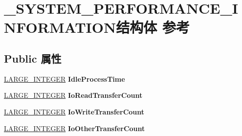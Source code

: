 \hypertarget{struct___s_y_s_t_e_m___p_e_r_f_o_r_m_a_n_c_e___i_n_f_o_r_m_a_t_i_o_n}{}\section{\+\_\+\+S\+Y\+S\+T\+E\+M\+\_\+\+P\+E\+R\+F\+O\+R\+M\+A\+N\+C\+E\+\_\+\+I\+N\+F\+O\+R\+M\+A\+T\+I\+O\+N结构体 参考}
\label{struct___s_y_s_t_e_m___p_e_r_f_o_r_m_a_n_c_e___i_n_f_o_r_m_a_t_i_o_n}
\subsection*{Public 属性}
\begin{DoxyCompactItemize}
\item 
\mbox{\label{struct___s_y_s_t_e_m___p_e_r_f_o_r_m_a_n_c_e___i_n_f_o_r_m_a_t_i_o_n_a7e06eb7b575a781a334819c48fd06e90}} 
\hyperlink{union___l_a_r_g_e___i_n_t_e_g_e_r}{L\+A\+R\+G\+E\+\_\+\+I\+N\+T\+E\+G\+ER} {\bfseries Idle\+Process\+Time}
\item 
\mbox{\label{struct___s_y_s_t_e_m___p_e_r_f_o_r_m_a_n_c_e___i_n_f_o_r_m_a_t_i_o_n_ae9a1b2dadebfe647979a7e69f3d70586}} 
\hyperlink{union___l_a_r_g_e___i_n_t_e_g_e_r}{L\+A\+R\+G\+E\+\_\+\+I\+N\+T\+E\+G\+ER} {\bfseries Io\+Read\+Transfer\+Count}
\item 
\mbox{\label{struct___s_y_s_t_e_m___p_e_r_f_o_r_m_a_n_c_e___i_n_f_o_r_m_a_t_i_o_n_a4738eacadbac2ca999960b487ce28195}} 
\hyperlink{union___l_a_r_g_e___i_n_t_e_g_e_r}{L\+A\+R\+G\+E\+\_\+\+I\+N\+T\+E\+G\+ER} {\bfseries Io\+Write\+Transfer\+Count}
\item 
\mbox{\label{struct___s_y_s_t_e_m___p_e_r_f_o_r_m_a_n_c_e___i_n_f_o_r_m_a_t_i_o_n_a3f72ecf4b9fec3bca8037be0bfac64ba}} 
\hyperlink{union___l_a_r_g_e___i_n_t_e_g_e_r}{L\+A\+R\+G\+E\+\_\+\+I\+N\+T\+E\+G\+ER} {\bfseries Io\+Other\+Transfer\+Count}
\item 
\mbox{\label{struct___s_y_s_t_e_m___p_e_r_f_o_r_m_a_n_c_e___i_n_f_o_r_m_a_t_i_o_n_a47afeb4b9ad994b33ea398afc51af958}} 

\end{DoxyCompactItemize}
